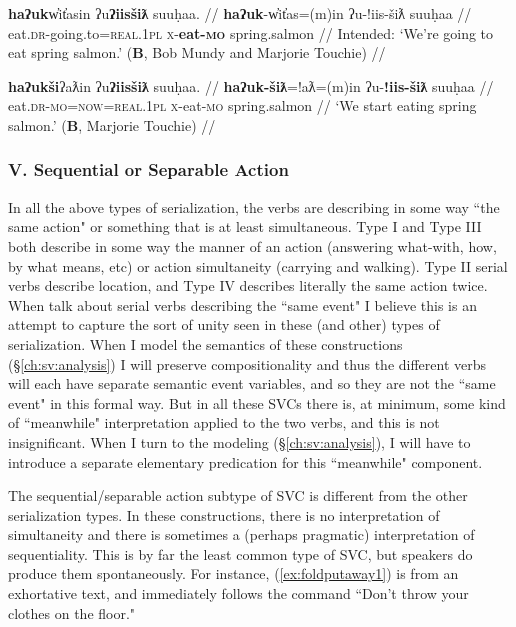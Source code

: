 \ex \label{ex:*eateat4}
\begingl
\glpreamble *\textbf{haʔuk}w̓it̓asin ʔu\textbf{ʔiisšiƛ} suuḥaa. //
\gla \textbf{haʔuk}-w̓it̓as=(m)in ʔu-!iis-šiƛ suuḥaa //
\glb eat.\textsc{dr}-going.to=\textsc{real.1pl} \textsc{x}-\textbf{eat-\textsc{mo}} spring.salmon //
\glft Intended: `We're going to eat spring salmon.' (\textbf{B}, Bob Mundy and Marjorie Touchie) //
\endgl
\xe

\ex \label{ex:eateat5}
\begingl
\glpreamble \textbf{haʔukši}ʔaƛin ʔu\textbf{ʔiisšiƛ} suuḥaa. //
\gla \textbf{haʔuk-šiƛ}=!aƛ=(m)in ʔu-\textbf{!iis-šiƛ} suuḥaa //
\glb eat.\textsc{dr}-\textsc{mo}=\textsc{now}=\textsc{real.1pl} \textsc{x}-eat-\textsc{mo} spring.salmon //
\glft `We start eating spring salmon.' (\textbf{B}, Marjorie Touchie) //
\endgl
\xe

\vspace{10pt}

\subsubsection{V. Sequential or Separable Action}

\vspace{10pt}

In all the above types of serialization, the verbs are describing in some way ``the same action" or something that is at least simultaneous. Type I and Type III both describe in some way the manner of an action (answering what-with, how, by what means, etc) or action simultaneity (carrying and walking). Type II serial verbs describe location, and Type IV describes literally the same action twice. When \cite{aikhenvalddixon2006} talk about serial verbs describing the ``same event" I believe this is an attempt to capture the sort of unity seen in these (and other) types of serialization. When I model the semantics of these constructions (\S\ref{ch:sv:analysis}) I will preserve compositionality and thus the different verbs will each have separate semantic event variables, and so they are not the ``same event" in this formal way. But in all these SVCs there is, at minimum, some kind of ``meanwhile" interpretation applied to the two verbs, and this is not insignificant. When I turn to the modeling (\S\ref{ch:sv:analysis}), I will have to introduce a separate elementary predication for this ``meanwhile" component.

The sequential/separable action subtype of SVC is different from the other serialization types. In these constructions, there is no interpretation of simultaneity and there is sometimes a (perhaps pragmatic) interpretation of sequentiality. This is by far the least common type of SVC, but speakers do produce them spontaneously. For instance, (\ref{ex:foldputaway1}) is from an exhortative text, and immediately follows the command ``Don't throw your clothes on the floor."

